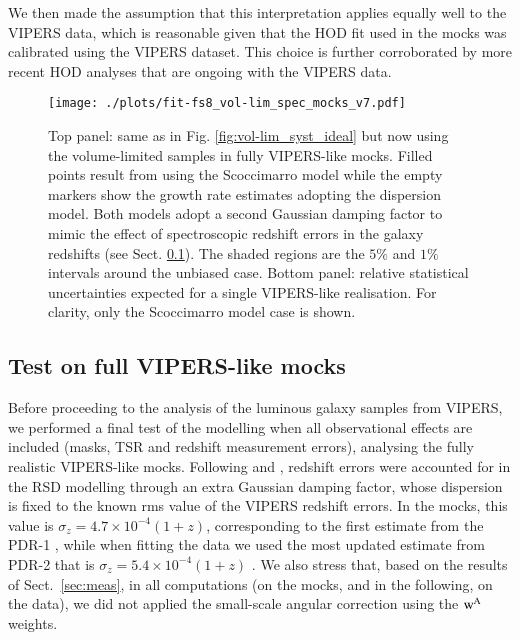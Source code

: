 \documentclass[longauth]{aa}
\def\({\left(}
\def\){\right)}
\begin{document}
We then made the assumption that this interpretation applies equally well to the VIPERS data, which is reasonable given that the HOD fit used in the mocks was calibrated using the VIPERS dataset. This choice is further corroborated by more recent HOD analyses that are ongoing with the VIPERS data.

	\begin{figure}
    	\centering
		\texttt{[image: ./plots/fit-fs8\_vol-lim\_spec\_mocks\_v7.pdf]}
		\caption{Top panel: same as in Fig. \ref{fig:vol-lim_syst_ideal} but now using the volume-limited samples in fully VIPERS-like mocks. Filled points result from using the Scoccimarro model while the empty markers show the growth rate estimates adopting the dispersion model. Both models adopt a second Gaussian damping factor to mimic the effect of spectroscopic redshift errors in the galaxy redshifts (see Sect. \ref{sec:tests_spec}). The shaded regions are the $5\%$ and $1\%$ intervals around the unbiased case. Bottom panel: relative statistical uncertainties expected for a single VIPERS-like realisation. For clarity, only the Scoccimarro model case is shown.}\label{fig:vol-lim_syst_spec}
	\end{figure}

\subsection{Test on full VIPERS-like mocks}		\label{sec:tests_spec}

Before proceeding to the analysis of the luminous galaxy samples from VIPERS,  we performed a final test of the modelling when all observational effects are included (masks, TSR and redshift measurement errors), analysing the fully realistic VIPERS-like mocks. Following \citet{delatorre16} and \citet{pezzotta16}, redshift errors were accounted for in the RSD modelling through an extra Gaussian damping factor, whose dispersion is fixed to the known rms value of the VIPERS redshift errors. In the mocks, this value is $\sigma_z=4.7\times10^{-4}\(1+z\)$, corresponding to the first estimate from the PDR-1 \citep{Guzzo14}, while when fitting the data we used the most updated estimate from PDR-2 that is $\sigma_z=5.4\times10^{-4}\(1+z\)$ \citep{Scodeggio16}. We also stress that, based on the results of Sect.~\ref{sec:meas}, in all computations (on the mocks, and in the following, on the data), we did not applied the small-scale angular correction using the $\rm{w^A}$ weights.
\end{document}
